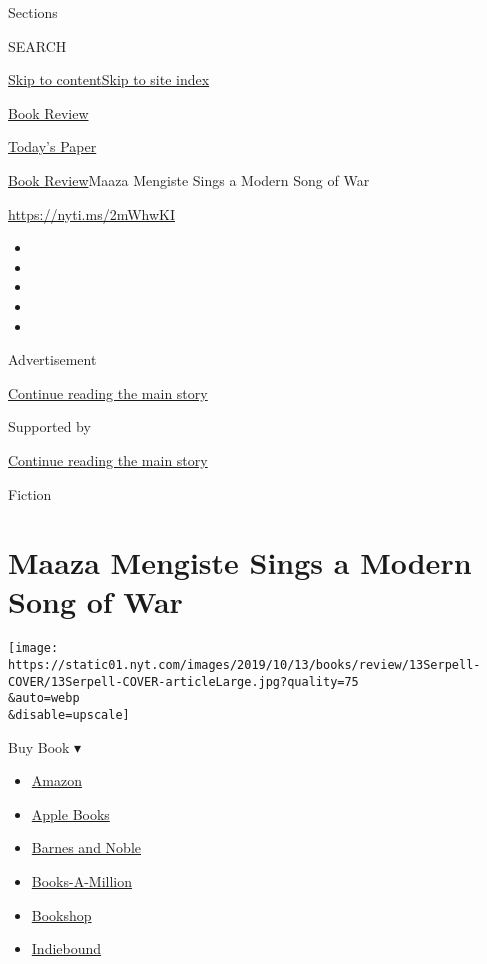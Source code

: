 Sections

SEARCH

\protect\hyperlink{site-content}{Skip to
content}\protect\hyperlink{site-index}{Skip to site index}

\href{https://www.nytimes.com/section/books/review}{Book Review}

\href{https://myaccount.nytimes.com/auth/login?response_type=cookie\&client_id=vi}{}

\href{https://www.nytimes.com/section/todayspaper}{Today's Paper}

\href{/section/books/review}{Book Review}\textbar{}Maaza Mengiste Sings
a Modern Song of War

\url{https://nyti.ms/2mWhwKI}

\begin{itemize}
\item
\item
\item
\item
\item
\end{itemize}

Advertisement

\protect\hyperlink{after-top}{Continue reading the main story}

Supported by

\protect\hyperlink{after-sponsor}{Continue reading the main story}

Fiction

\hypertarget{maaza-mengiste-sings-a-modern-song-of-war}{%
\section{Maaza Mengiste Sings a Modern Song of
War}\label{maaza-mengiste-sings-a-modern-song-of-war}}

\texttt{[image: https://static01.nyt.com/images/2019/10/13/books/review/13Serpell-COVER/13Serpell-COVER-articleLarge.jpg?quality=75\\\&auto=webp\\\&disable=upscale]}

Buy Book ▾

\begin{itemize}
\tightlist
\item
  \href{https://www.amazon.com/gp/search?index=books\&tag=NYTBSREV-20\&field-keywords=The+Shadow+King+Maaza+Mengiste}{Amazon}
\item
  \href{https://du-gae-books-dot-nyt-du-prd.appspot.com/buy?title=The+Shadow+King\&author=Maaza+Mengiste}{Apple
  Books}
\item
  \href{https://www.anrdoezrs.net/click-7990613-11819508?url=https\%3A\%2F\%2Fwww.barnesandnoble.com\%2Fw\%2F\%3Fean\%3D9780393083569}{Barnes
  and Noble}
\item
  \href{https://www.anrdoezrs.net/click-7990613-35140?url=https\%3A\%2F\%2Fwww.booksamillion.com\%2Fp\%2FThe\%2BShadow\%2BKing\%2FMaaza\%2BMengiste\%2F9780393083569}{Books-A-Million}
\item
  \href{https://bookshop.org/a/3546/9780393083569}{Bookshop}
\item
  \href{https://www.indiebound.org/book/9780393083569?aff=NYT}{Indiebound}
\end{itemize}

